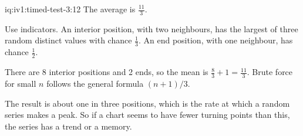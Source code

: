 \begin{solution}{iq:iv1:timed-test-3:12}
The average is $\frac{11}{3}$.

Use indicators. An interior position, with two neighbours, has the largest of three random distinct values with chance $\frac13$. An end position, with one neighbour, has chance $\frac12$.

There are 8 interior positions and 2 ends, so the mean is $\frac83 + 1 = \frac{11}{3}$. Brute force for small $n$ follows the general formula $(n + 1)/3$.

The result is about one in three positions, which is the rate at which a random series makes a peak. So if a chart seems to have fewer turning points than this, the series has a trend or a memory.

\end{solution}
